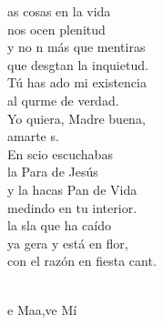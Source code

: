 \documentclass[12pt]{article}
\begin{document}
\begin{multicols*}{2}
\begin{cancion}%
	as cosas en la vida\\
	nos ocen plenitud\\
	y no n más que mentiras\\
	que desgtan la inquietud.\\
	Tú has ado mi existencia\\
	al qurme de verdad.\\
	Yo quiera, Madre buena,\\
	amarte s.	\\
	En scio escuchabas\\
	la Para de Jesús\\
	y la hacas Pan de Vida\\
	medindo en tu interior.\\
	la sla que ha caído\\
	ya gera y está en flor,\\
	con el razón en fiesta cant. \\\jump\\
	\begin{chorus}%
	e Maa,ve Mí\\
	\end{chorus}%
	\jump\\
\end{cancion}%


\end{multicols*}
\end{document}
